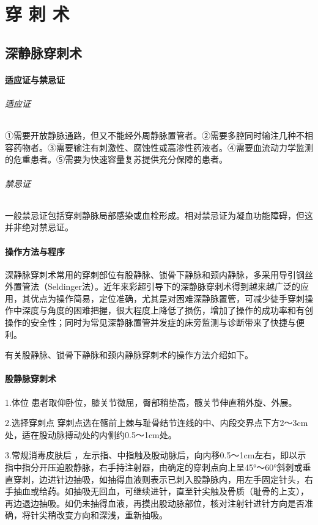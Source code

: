 \protect\hypertarget{text00377.html}{}{}

\chapter{穿 刺 术}

\section{深静脉穿刺术}

\subsubsection{适应证与禁忌证}

\subparagraph{适应证}

①需要开放静脉通路，但又不能经外周静脉置管者。②需要多腔同时输注几种不相容药物者。③需要输注有刺激性、腐蚀性或高渗性药液者。④需要血流动力学监测的危重患者。⑤需要为快速容量复苏提供充分保障的患者。

\subparagraph{禁忌证}

一般禁忌证包括穿刺静脉局部感染或血栓形成。相对禁忌证为凝血功能障碍，但这并非绝对禁忌证。

\subsubsection{操作方法与程序}

深静脉穿刺术常用的穿刺部位有股静脉、锁骨下静脉和颈内静脉，多采用导引钢丝外置管法（Seldinger法）。近年来彩超引导下的深静脉穿刺术得到越来越广泛的应用，其优点为操作简易，定位准确，尤其是对困难深静脉置管，可减少徒手穿刺操作中深度与角度的困难把握，很大程度上降低了损伤，增加了操作的成功率和有创操作的安全性；同时为常见深静脉置管并发症的床旁监测与诊断带来了快捷与便利。

有关股静脉、锁骨下静脉和颈内静脉穿刺术的操作方法介绍如下。

\subsubsection{股静脉穿刺术}

1.体位 患者取仰卧位，膝关节微屈，臀部稍垫高，髋关节伸直稍外旋、外展。

2.选择穿刺点
穿刺点选在髂前上棘与耻骨结节连线的中、内段交界点下方2～3cm处，适在股动脉搏动处的内侧约0.5～1cm处。

3.常规消毒皮肤后
，左示指、中指触及股动脉后，向内移0.5～1cm左右，即以示指中指分开压迫股静脉，右手持注射器，由确定的穿刺点向上呈45°～60°斜刺或垂直穿刺，边进针边抽吸，如抽得血液则表示已刺入股静脉内，用左手固定针头，右手抽血或给药。如抽吸无回血，可继续进针，直至针尖触及骨质（耻骨的上支），再边退边抽吸。如仍未抽得血液，再摸出股动脉部位，核对注射针进针方向是否准确，将针尖稍改变方向和深浅，重新抽吸。

